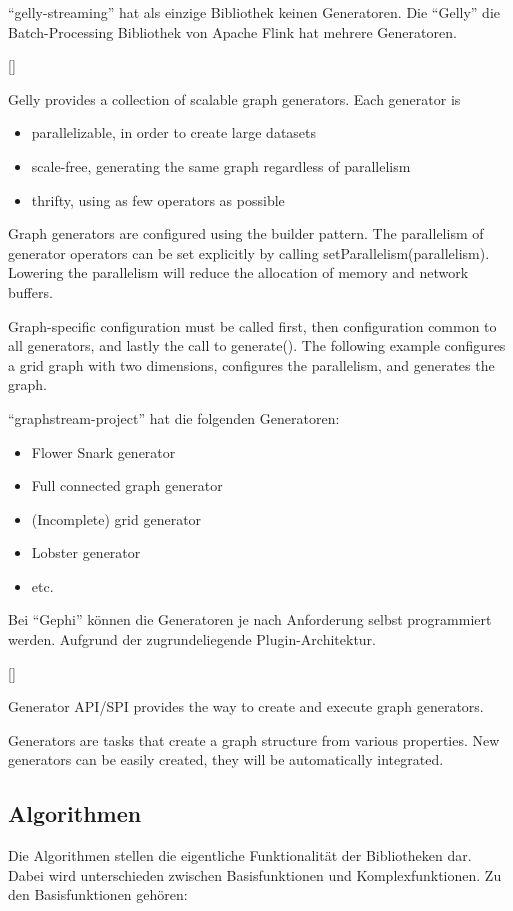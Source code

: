 \enquote{gelly-streaming} hat als einzige Bibliothek keinen Generatoren.
Die \enquote{Gelly} die Batch-Processing Bibliothek von Apache Flink hat mehrere
Generatoren.

[\cite{Foundation2018}]{
Gelly provides a collection of scalable graph generators. Each generator is

\begin{itemize}
\item parallelizable, in order to create large datasets
\item scale-free, generating the same graph regardless of parallelism
\item thrifty, using as few operators as possible
\end{itemize}

Graph generators are configured using the builder pattern. The parallelism of
generator operators can be set explicitly by calling setParallelism(parallelism).
Lowering the parallelism will reduce the allocation of memory and network buffers.

Graph-specific configuration must be called first, then configuration common to
all generators, and lastly the call to generate(). The following example
configures a grid graph with two dimensions, configures the parallelism, and
generates the graph.
}

\enquote{graphstream-project} hat die folgenden Generatoren:

\begin{itemize}
\item Flower Snark generator
\item Full connected graph generator
\item (Incomplete) grid generator
\item Lobster generator
\item etc.
\end{itemize}

Bei \enquote{Gephi} können die Generatoren je nach Anforderung selbst
programmiert werden. Aufgrund der zugrundeliegende Plugin-Architektur.

[\cite{Bastian2009}]{
Generator API/SPI provides the way to create and execute graph generators.

Generators are tasks that create a graph structure from various properties.
New generators can be easily created, they will be automatically integrated.
}

\subsection{Algorithmen}
Die Algorithmen stellen die eigentliche Funktionalität der Bibliotheken dar.
Dabei wird unterschieden zwischen Basisfunktionen und Komplexfunktionen.
Zu den Basisfunktionen gehören:

